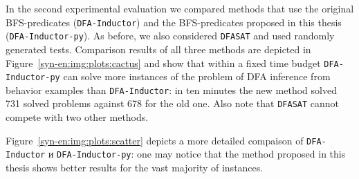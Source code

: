 \begin{table}[ht]
  \caption{Median execution time in seconds for methods of DFA inference from behavior examples: method based on BFS symmetry breaking predicates, based on DFS symmetry breaking predicates, and the \texttt{DFASAT} method. Each value was calculated as a result of 100 independent runs on 100 problems. The execution of the methods was limited to one hour ($\text{TL} = 3600\,\, \text{seconds}$)}
  \centering
  \label{syn-en:tab:DFS-results}
\end{table}

In the second experimental evaluation we compared methods that use the original BFS-predicates (\texttt{DFA-Inductor}) and the BFS-predicates proposed in this thesis (\texttt{DFA-Inductor-py}).
As before, we also considered \texttt{DFASAT} and used randomly generated tests.
Comparison results of all three methods are depicted in Figure~\ref{syn-en:img:plots:cactus} and show that within a fixed time budget \texttt{DFA-Inductor-py} can solve more instances of the problem of DFA inference from behavior examples than \texttt{DFA-Inductor}: in ten minutes the new method solved 731 solved problems against 678 for the old one.
Also note that \texttt{DFASAT} cannot compete with two other methods.

Figure~\ref{syn-en:img:plots:scatter} depicts a more detailed compaison of \texttt{DFA-Inductor} и \texttt{DFA-Inductor-py}: one may notice that the method proposed in this thesis
shows better results for the vast majority of instances.

